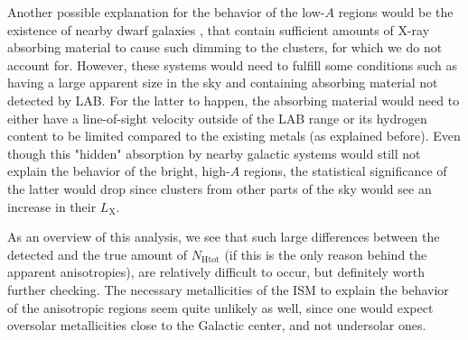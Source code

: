 \documentclass{aa}   %
\begin{document}

Another possible explanation for the behavior of the low-$A$ regions would be the existence of nearby dwarf galaxies \citep[e.g.,][]{dwarf_gal}, that contain sufficient amounts of X-ray absorbing material to cause such dimming to the clusters, for which we do not account for. However, these systems would need to fulfill some conditions such as having a large apparent size in the sky and containing absorbing material not detected by LAB. For the latter to happen, the absorbing material would need to either have a line-of-sight velocity outside of the LAB range or its hydrogen content to be limited compared to the existing metals (as explained before). Even though this "hidden" absorption by nearby galactic systems would still not explain the behavior of the bright, high-$A$ regions, the statistical significance of the latter would drop since clusters from other parts of the sky would see an increase in their $L_{\text{X}}$.

As an overview of this analysis, we see that such large differences between the detected and the true amount of $N_{\text{Htot}}$ (if this is the only reason behind the apparent anisotropies), are relatively difficult to occur, but definitely worth further checking. The necessary metallicities of the ISM to explain the behavior of the anisotropic regions seem quite unlikely as well, since one would expect oversolar metallicities close to the Galactic center, and not undersolar ones.
\end{document}

